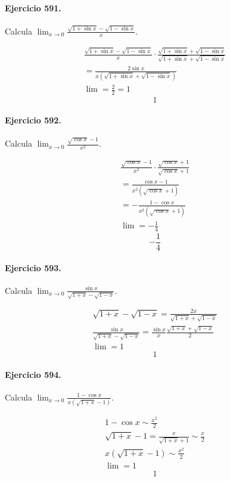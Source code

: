 \documentclass[11pt,a4paper]{article}
\begin{document}
\paragraph{Ejercicio 591.} Calcula $\displaystyle \lim_{x\to0}\frac{\sqrt{1+\sin x}-\sqrt{1-\sin x}}{x}$.

\[
\begin{aligned}
\frac{\sqrt{1+\sin x}-\sqrt{1-\sin x}}{x}\cdot\frac{\sqrt{1+\sin x}+\sqrt{1-\sin x}}{\sqrt{1+\sin x}+\sqrt{1-\sin x}}\\
=\frac{2\sin x}{x(\sqrt{1+\sin x}+\sqrt{1-\sin x})}\\
\lim=\frac{2}{2}=1
\end{aligned}
\]
\[\boxed{1}\]


\paragraph{Ejercicio 592.} Calcula $\displaystyle \lim_{x\to0}\frac{\sqrt{\cos x}-1}{x^2}$.

\[
\begin{aligned}
\frac{\sqrt{\cos x}-1}{x^2}\cdot\frac{\sqrt{\cos x}+1}{\sqrt{\cos x}+1}\\
=\frac{\cos x-1}{x^2(\sqrt{\cos x}+1)}\\
=-\frac{1-\cos x}{x^2(\sqrt{\cos x}+1)}\\
\lim=-\frac14
\end{aligned}
\]
\[\boxed{-\frac14}\]


\paragraph{Ejercicio 593.} Calcula $\displaystyle \lim_{x\to0}\frac{\sin x}{\sqrt{1+x}-\sqrt{1-x}}$.

\[
\begin{aligned}
\sqrt{1+x}-\sqrt{1-x}=\frac{2x}{\sqrt{1+x}+\sqrt{1-x}}\\
\frac{\sin x}{\sqrt{1+x}-\sqrt{1-x}}=\frac{\sin x}{x}\frac{\sqrt{1+x}+\sqrt{1-x}}{2}\\
\lim=1
\end{aligned}
\]
\[\boxed{1}\]


\paragraph{Ejercicio 594.} Calcula $\displaystyle \lim_{x\to0}\frac{1-\cos x}{x(\sqrt{1+x}-1)}$.

\[
\begin{aligned}
1-\cos x\sim\frac{x^2}{2}\\
\sqrt{1+x}-1=\frac{x}{\sqrt{1+x}+1}\sim\frac{x}{2}\\
x(\sqrt{1+x}-1)\sim\frac{x^2}{2}\\
\lim=1
\end{aligned}
\]
\[\boxed{1}\]
\end{document}
